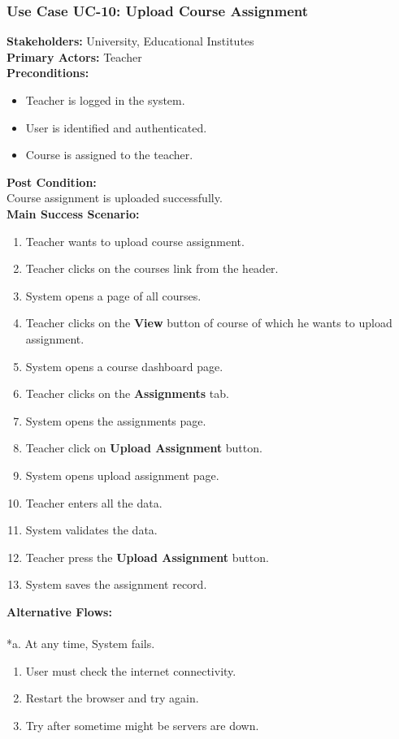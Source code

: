 \documentclass[12pt]{article}
\begin{document}
\subsubsection{Use Case UC-10: Upload Course Assignment}
\textbf{Stakeholders: } University, Educational Institutes \\
\textbf{Primary Actors: }Teacher \\
\textbf{Preconditions:}
\begin{itemize}
\item Teacher is logged in the system.
\item User is identified and authenticated.
\item Course is assigned to the teacher.
\end{itemize}
\textbf{Post Condition: }\\
Course assignment is uploaded successfully.\\
\textbf{Main Success Scenario:}
\begin{enumerate}
\item Teacher wants to upload course assignment.
\item Teacher clicks on the courses link from the header.
\item System opens a page of all courses.
\item Teacher clicks on the \textbf{View} button of course of which he wants to upload assignment.
\item System opens a course dashboard page.
\item Teacher clicks on the \textbf{Assignments} tab.
\item System opens the assignments page.
\item Teacher click on \textbf{Upload Assignment} button.
\item System opens upload assignment page.
\item Teacher enters all the data.
\item System validates the data.
\item Teacher press the \textbf{Upload Assignment} button.
\item System saves the assignment record.
\end{enumerate}
\textbf{Alternative Flows:}\\
\\
*a. At any time, System fails.
\begin{enumerate}
\item User must check the internet connectivity.
\item Restart the browser and try again.
\item Try after sometime might be servers are down.
\end{enumerate}
\end{document}
